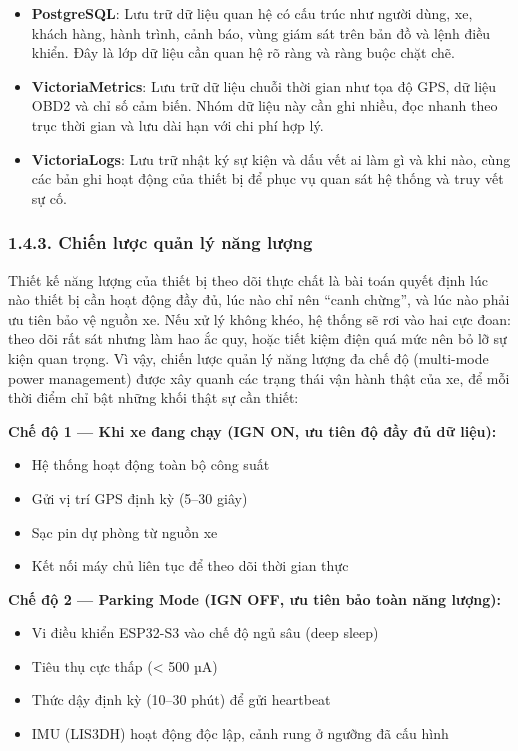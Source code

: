 \documentclass[a4paper]{extarticle}
\providecommand{\tightlist}{%
  \setlength{\itemsep}{0pt}\setlength{\parskip}{0pt}}
\begin{document}
\begin{itemize}
\tightlist
\item
  \textbf{PostgreSQL}: Lưu trữ dữ liệu quan hệ có cấu trúc như người
  dùng, xe, khách hàng, hành trình, cảnh báo, vùng giám sát trên bản đồ
  và lệnh điều khiển. Đây là lớp dữ liệu cần quan hệ rõ ràng và ràng
  buộc chặt chẽ.
\item
  \textbf{VictoriaMetrics}: Lưu trữ dữ liệu chuỗi thời gian như tọa độ
  GPS, dữ liệu OBD2 và chỉ số cảm biến. Nhóm dữ liệu này cần ghi nhiều,
  đọc nhanh theo trục thời gian và lưu dài hạn với chi phí hợp lý.
\item
  \textbf{VictoriaLogs}: Lưu trữ nhật ký sự kiện và dấu
  vết ai làm gì và khi nào, cùng các bản
  ghi hoạt động của thiết bị để phục vụ quan sát hệ thống và truy vết sự
  cố.
\end{itemize}

\subsubsection{1.4.3. Chiến lược quản lý năng
lượng}\label{143-chiux1ebfn-lux1b0ux1ee3c-quux1ea3n-luxfd-nux103ng-lux1b0ux1ee3ng}

Thiết kế năng lượng của thiết bị theo dõi thực chất là bài toán quyết định lúc nào
thiết bị cần hoạt động đầy đủ, lúc nào chỉ nên ``canh chừng'', và lúc nào
phải ưu tiên bảo vệ nguồn xe. Nếu xử lý không khéo, hệ thống sẽ rơi vào
hai cực đoan: theo dõi rất sát nhưng làm hao ắc quy, hoặc tiết kiệm điện
quá mức nên bỏ lỡ sự kiện quan trọng. Vì vậy, chiến lược quản lý năng
lượng đa chế độ (multi-mode power management) được xây quanh các trạng
thái vận hành thật của xe, để mỗi thời điểm chỉ bật những khối thật sự
cần thiết:

\textbf{Chế độ 1 --- Khi xe đang chạy (IGN ON, ưu tiên độ đầy đủ dữ liệu):}

\begin{itemize}
\tightlist
\item
  Hệ thống hoạt động toàn bộ công suất
\item
  Gửi vị trí GPS định kỳ (5--30 giây)
\item
  Sạc pin dự phòng từ nguồn xe
\item
  Kết nối máy chủ liên tục để theo dõi thời gian thực
\end{itemize}

\textbf{Chế độ 2 --- Parking Mode (IGN OFF, ưu tiên bảo toàn năng lượng):}

\begin{itemize}
\tightlist
\item
  Vi điều khiển ESP32-S3 vào chế độ ngủ sâu (deep sleep)
\item
  Tiêu thụ cực thấp (\textless{} 500 µA)
\item
  Thức dậy định kỳ (10--30 phút) để gửi heartbeat
\item
  IMU (LIS3DH) hoạt động độc lập, cảnh rung ở ngưỡng đã cấu hình
\end{itemize}
\end{document}
